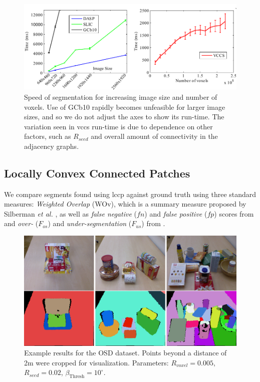 \begin{figure}
\begin{center}
\includegraphics[width=0.95\linewidth]{figures/CVPR2013/Speed.pdf}
\end{center}
   \caption[Segmentation Speed]{Speed of segmentation for increasing image size and number of voxels. Use of GCb10 rapidly becomes unfeasible for larger image sizes, and so we do not adjust the axes to show its run-time. The variation seen in \gls{vccs} run-time is due to dependence on other factors, such as ${R}_{seed}$ and overall amount of connectivity in the adjacency graphs.}
\label{fig:SegmentationSpeed}
\end{figure}

\subsection{Locally Convex Connected Patches}

We compare segments found using \gls{lccp} against ground truth using three standard measures: \textit{Weighted Overlap} (WOv), which is a summary measure proposed by Silberman \textit{et al.} \cite{Silberman:ECCV12}, as well as \textit{false negative} ($fn$) and \textit{false positive} ($fp$) scores from \cite{Ritter2012} and \textit{over-} ($F_{os}$) and \textit{under-segmentation} ($F_{us}$) from \cite{Richtsfeld:IROS12}.

\begin{figure}
 \centering
 \includegraphics[width=1\linewidth]{figures/CVPR2014/osd_examples}
 \caption[OSD Dataset Examples]{ Example results for the OSD dataset. Points beyond a distance of 2m were cropped for visualization. Parameters: $R_{voxel}=0.005$, $R_{seed}=0.02$, $\beta_\text{Thresh}=10^\circ$.  }
 \label{fig:OSD_results}
\end{figure}

